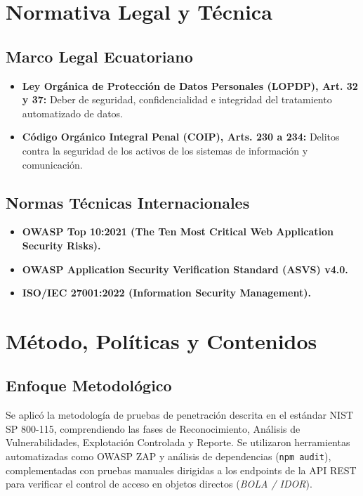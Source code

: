 \documentclass[12pt,a4paper]{article}
\begin{document}
\section{Normativa Legal y Técnica}
\subsection{Marco Legal Ecuatoriano}
\begin{itemize}[leftmargin=1.5em, itemsep=2pt]
    \item \textbf{Ley Orgánica de Protección de Datos Personales (LOPDP), Art. 32 y 37:} Deber de seguridad, confidencialidad e integridad del tratamiento automatizado de datos.
    \item \textbf{Código Orgánico Integral Penal (COIP), Arts. 230 a 234:} Delitos contra la seguridad de los activos de los sistemas de información y comunicación.
\end{itemize}
\subsection{Normas Técnicas Internacionales}
\begin{itemize}[leftmargin=1.5em, itemsep=2pt]
    \item \textbf{OWASP Top 10:2021 (The Ten Most Critical Web Application Security Risks).}
    \item \textbf{OWASP Application Security Verification Standard (ASVS) v4.0.}
    \item \textbf{ISO/IEC 27001:2022 (Information Security Management).}
\end{itemize}

\section{Método, Políticas y Contenidos}
\subsection{Enfoque Metodológico}
Se aplicó la metodología de pruebas de penetración descrita en el estándar NIST SP 800-115, comprendiendo las fases de Reconocimiento, Análisis de Vulnerabilidades, Explotación Controlada y Reporte. Se utilizaron herramientas automatizadas como OWASP ZAP y análisis de dependencias (\texttt{npm audit}), complementadas con pruebas manuales dirigidas a los endpoints de la API REST para verificar el control de acceso en objetos directos (\textit{BOLA / IDOR}).
\end{document}
